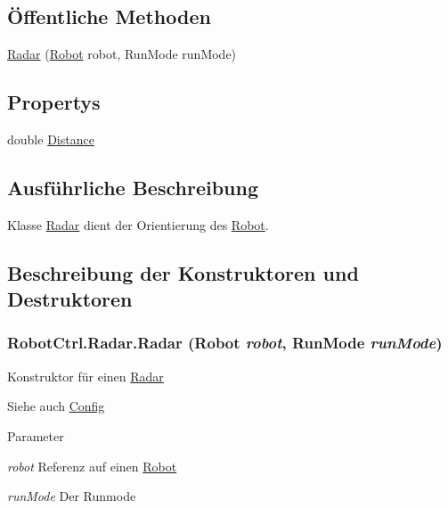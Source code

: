 \subsection*{Öffentliche Methoden}
\begin{DoxyCompactItemize}
\item 
\hyperlink{class_robot_ctrl_1_1_radar_aec75e7f4e126ac40c008c5d30d1c8dba}{Radar} (\hyperlink{class_robot_ctrl_1_1_robot}{Robot} robot, RunMode runMode)
\end{DoxyCompactItemize}
\subsection*{Propertys}
\begin{DoxyCompactItemize}
\item 
double \hyperlink{class_robot_ctrl_1_1_radar_a0339d462806cb7fc3759d850b5564dd9}{Distance}
\end{DoxyCompactItemize}


\subsection{Ausführliche Beschreibung}
Klasse \hyperlink{class_robot_ctrl_1_1_radar}{Radar} dient der Orientierung des \hyperlink{class_robot_ctrl_1_1_robot}{Robot}. 

\subsection{Beschreibung der Konstruktoren und Destruktoren}
\hypertarget{class_robot_ctrl_1_1_radar_aec75e7f4e126ac40c008c5d30d1c8dba}{
\subsubsection[{Radar}]{\setlength{\rightskip}{0pt plus 5cm}RobotCtrl.Radar.Radar ({\bf Robot} {\em robot}, \/  RunMode {\em runMode})}}
\label{class_robot_ctrl_1_1_radar_aec75e7f4e126ac40c008c5d30d1c8dba}
Konstruktor f\"{u}r einen \hyperlink{class_robot_ctrl_1_1_radar}{Radar} \begin{DoxySeeAlso}{Siehe auch}
\hyperlink{class_robot_ctrl_1_1_config}{Config}
\end{DoxySeeAlso}

\begin{DoxyParams}{Parameter}
\item[{\em robot}]Referenz auf einen \hyperlink{class_robot_ctrl_1_1_robot}{Robot} \item[{\em runMode}]Der Runmode \end{DoxyParams}


